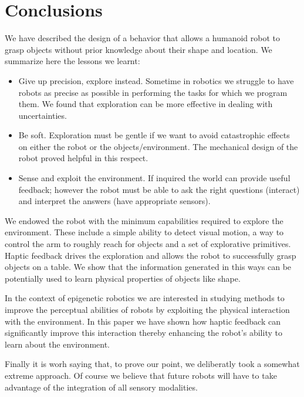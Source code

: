 \section{Conclusions}
\label{sec:conclusions}

We have described the design of a behavior that allows a humanoid 
robot to grasp objects without prior knowledge about their shape 
and location. We summarize here the lessons we learnt:
\begin{itemize}

\item Give up precision, explore instead. Sometime in robotics 
we struggle to have robots as precise as possible in performing 
the tasks for which we program them. We found that exploration 
can be more effective in dealing with uncertainties.

\item Be soft. Exploration must be gentle if we want to 
avoid catastrophic effects on either the robot or the objects/environment. 
The mechanical design of the robot proved helpful in this respect.

\item Sense and exploit the environment. If inquired the world 
can provide useful feedback; however the robot must be able 
to ask the right questions (interact) and interpret the answers 
(have appropriate sensors).

\end{itemize}

We endowed the robot with the minimum capabilities required to explore 
the environment. These include a simple ability to detect visual
motion, a way to control the arm to roughly reach for objects and a 
set of explorative primitives. Haptic feedback drives the 
exploration and allows the robot to successfully grasp objects on 
a table. We show that the information generated in this ways
can be potentially used to learn physical properties of objects like shape.

In the context of epigenetic robotics we are interested in studying
methods to improve the perceptual abilities of robots by exploiting the
physical interaction with the environment. In this paper we have shown 
how haptic feedback can significantly improve this interaction thereby
enhancing the robot's ability to learn about the environment. 

Finally it is worh saying that, to prove our point, we deliberatly 
took a somewhat extreme approach. Of course we believe that future 
robots will have to take advantage of the integration of all sensory 
modalities.

